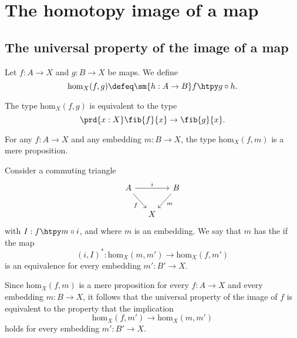 \chapter{The homotopy image of a map}
\section{The universal property of the image of a map}

\begin{defn}
Let $f:A\to X$ and $g:B\to X$ be maps. We define
\begin{equation*}
\mathrm{hom}_X(f,g)\defeq\sm{h:A\to B}f\htpy g\circ h.
\end{equation*}
\end{defn}

\begin{rmk}
The type $\mathrm{hom}_X(f,g)$ is equivalent to the type
\begin{equation*}
\prd{x:X}\fib{f}{x}\to\fib{g}{x}.
\end{equation*}
\end{rmk}

\begin{lem}
For any $f:A\to X$ and any embedding $m:B\to X$, the type $\mathrm{hom}_X(f,m)$ is a mere proposition.
\end{lem}

\begin{defn}
Consider a commuting triangle
\begin{equation*}
\begin{tikzcd}[column sep=small]
A \arrow[rr,"i"] \arrow[dr,swap,"f"] & & B \arrow[dl,"m"] \\
& X
\end{tikzcd}
\end{equation*}
with $I:f\htpy m\circ i$, and where $m$ is an embedding.
We say that $m$ has the  if the map
\begin{equation*}
(i,I)^\ast : \mathrm{hom}_X(m,m')\to\mathrm{hom}_X(f,m')
\end{equation*}
is an equivalence for every embedding $m':B'\to X$. 
\end{defn}

\begin{rmk}
Since $\mathrm{hom}_X(f,m)$ is a mere proposition for every $f:A\to X$ and every embedding $m:B\to X$, it follows that the universal property of the image of $f$ is equivalent to the property that the implication
\begin{equation*}
\mathrm{hom}_X(f,m')\to\mathrm{hom}_X(m,m')
\end{equation*}
holds for every embedding $m':B'\to X$. 
\end{rmk}

